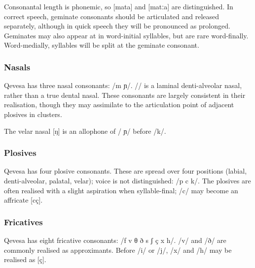 \documentclass[grammar]{subfiles}
\begin{document}
  Consonantal length is phonemic, so [mata] and [matːa] are distinguished.  In
  correct speech, geminate consonants should be articulated and released
  separately, although in quick speech they will be pronounced as prolonged.
  Geminates may also appear at in word-initial syllables, but are rare
  word-finally.  Word-medially, syllables will be split at the geminate
  consonant.

  \subsubsection{Nasals}
  \label{sssec:nasals}

  Qevesa has three nasal consonants: /m  ɲ/.  // is a laminal
  denti-alveolar nasal, rather than a true dental nasal.  These consonants are
  largely consistent in their realisation, though they may assimilate to the
  articulation point of adjacent plosives in clusters. 

  The velar nasal [ŋ] is an allophone of / ɲ/ before /k/.

  \subsubsection{Plosives}
  \label{sssec:plosives}

  Qevesa has four plosive consonants.  These are spread over four positions
  (labial, denti-alveolar, palatal, velar); voice is not distinguished: /p
   c k/.  The plosives are often realised with a slight aspiration when
  syllable-final; /c/ may become an affricate [cç].  
  

  \subsubsection{Fricatives}
  \label{sssec:fricatives}

  Qevesa has eight fricative consonants: /f v θ ð s ʃ ç x h/.  /v/ and /ð/ are
  commonly realised as approximants.  Before /i/ or /j/, /x/ and /h/ may be
  realised as [ç].
% 
\end{document}
